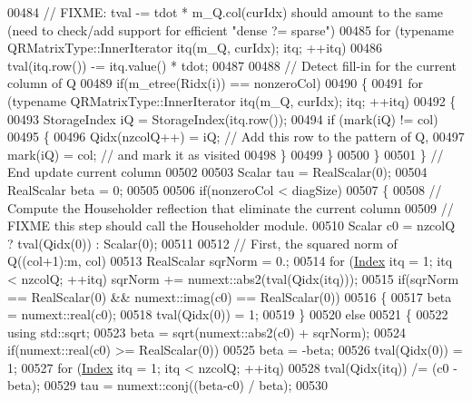 \begin{DoxyCode}
00484       \textcolor{comment}{// FIXME: tval -= tdot * m\_Q.col(curIdx) should amount to the same (need to check/add support for
       efficient "dense ?= sparse")}
00485       \textcolor{keywordflow}{for} (\textcolor{keyword}{typename} QRMatrixType::InnerIterator itq(m\_Q, curIdx); itq; ++itq)
00486         tval(itq.row()) -= itq.value() * tdot;
00487 
00488       \textcolor{comment}{// Detect fill-in for the current column of Q}
00489       \textcolor{keywordflow}{if}(m\_etree(Ridx(i)) == nonzeroCol)
00490       \{
00491         \textcolor{keywordflow}{for} (\textcolor{keyword}{typename} QRMatrixType::InnerIterator itq(m\_Q, curIdx); itq; ++itq)
00492         \{
00493           StorageIndex iQ = StorageIndex(itq.row());
00494           \textcolor{keywordflow}{if} (mark(iQ) != col)
00495           \{
00496             Qidx(nzcolQ++) = iQ;  \textcolor{comment}{// Add this row to the pattern of Q,}
00497             mark(iQ) = col;       \textcolor{comment}{// and mark it as visited}
00498           \}
00499         \}
00500       \}
00501     \} \textcolor{comment}{// End update current column}
00502     
00503     Scalar tau = RealScalar(0);
00504     RealScalar beta = 0;
00505     
00506     \textcolor{keywordflow}{if}(nonzeroCol < diagSize)
00507     \{
00508       \textcolor{comment}{// Compute the Householder reflection that eliminate the current column}
00509       \textcolor{comment}{// FIXME this step should call the Householder module.}
00510       Scalar c0 = nzcolQ ? tval(Qidx(0)) : Scalar(0);
00511       
00512       \textcolor{comment}{// First, the squared norm of Q((col+1):m, col)}
00513       RealScalar sqrNorm = 0.;
00514       \textcolor{keywordflow}{for} (\hyperlink{namespace_eigen_a62e77e0933482dafde8fe197d9a2cfde}{Index} itq = 1; itq < nzcolQ; ++itq) sqrNorm += numext::abs2(tval(Qidx(itq)));
00515       \textcolor{keywordflow}{if}(sqrNorm == RealScalar(0) && numext::imag(c0) == RealScalar(0))
00516       \{
00517         beta = numext::real(c0);
00518         tval(Qidx(0)) = 1;
00519       \}
00520       \textcolor{keywordflow}{else}
00521       \{
00522         \textcolor{keyword}{using} std::sqrt;
00523         beta = sqrt(numext::abs2(c0) + sqrNorm);
00524         \textcolor{keywordflow}{if}(numext::real(c0) >= RealScalar(0))
00525           beta = -beta;
00526         tval(Qidx(0)) = 1;
00527         \textcolor{keywordflow}{for} (\hyperlink{namespace_eigen_a62e77e0933482dafde8fe197d9a2cfde}{Index} itq = 1; itq < nzcolQ; ++itq)
00528           tval(Qidx(itq)) /= (c0 - beta);
00529         tau = numext::conj((beta-c0) / beta);
00530           

\end{DoxyCode}
